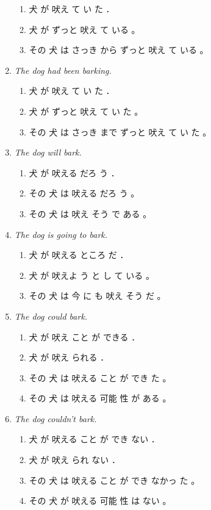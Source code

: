 \documentclass[a4paper,landscape,headrule,footrule,xetex]{foils}
\begin{document}
\begin{enumerate}
\begin{enumerate}
  \item 犬 が 吠え て い た ．
  \item 犬 が ずっと 吠え て いる 。
  \item その 犬 は さっき から ずっと 吠え て いる 。 
  \end{enumerate}
\item \textit{The dog had been barking.}
  \begin{enumerate}
  \item 犬 が 吠え て い た ．
  \item 犬 が ずっと 吠え て い た 。
  \item その 犬 は さっき まで ずっと 吠え て い た 。 
  \end{enumerate}
\item \textit{The dog will bark.}
  \begin{enumerate}
  \item 犬 が 吠える だろ う ．
  \item その 犬 は 吠える だろ う 。
  \item その 犬 は 吠え そう で ある 。
  \end{enumerate}
\item \textit{The dog is going to bark.}
  \begin{enumerate}
  \item 犬 が 吠える ところ だ ．
  \item 犬 が 吠えよ う と し て いる 。
  \item その 犬 は 今 に も 吠え そう だ 。 
  \end{enumerate}
\newpage
\item \textit{The dog could bark.}
  \begin{enumerate}
  \item 犬 が 吠え こと が できる ．
  \item 犬 が 吠え られる ．
  \item その 犬 は 吠える こと が でき た 。
  \item その 犬 は 吠える 可能 性 が ある 。 
  \end{enumerate}
\item \textit{The dog couldn't bark.}
  \begin{enumerate}
  \item 犬 が 吠える こと が でき ない ．
  \item 犬 が 吠え られ ない ．
  \item その 犬 は 吠える こと が でき なかっ た 。
  \item その 犬 が 吠える 可能 性 は ない 。 
  \end{enumerate}
\end{enumerate}
 \makexeCJKinactive
\end{document}
